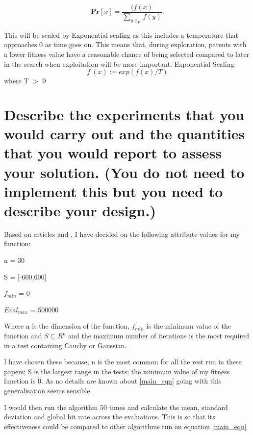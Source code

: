 \documentclass{article}
\begin{document}
\begin{equation}
\textbf{Pr}[x] = \frac{(f(x)}{\sum_{y\in_P} f(y)} .
\end{equation} 

This will be scaled by Exponential scaling as this includes a temperature that approaches 0 as time goes on. This means that, during exploration, parents with a lower fitness value have a reasonable chance of being selected compared to later in the search when exploitation will be more important. 
\bigbreak
Exponential Scaling:
\begin{equation}
 f~(x) := exp(f(x)/T)	
\end{equation}
where T $>$ 0

\section{Describe the experiments that you would carry out and the quantities that you would report to assess your solution. (You do not need to implement this but you need to describe your design.)}

Based on articles \cite{landscape} and \cite{faster}, I have decided on the following attribute values for my function:

\centerline{n = 30}
\centerline{S = $[$-600,600$]$}
\centerline{$f_{min}$ = 0}
\centerline{$Eval_{max}$ = 500000}

\smallbreak
Where n is the dimension of the function, $f_{min}$ is the minimum value of the function and $S \subseteq R^n$ and the maximum number of iterations is the most required in a test containing Cauchy or Gaussian.

I have chosen these because; n is the most common for all the rest run in these papers; S is the largest range in the tests; the minimum value of my fitness function is 0. As no details are known about \ref{main_eqn} going with this generalisation seems sensible.

\smallbreak

I would then run the algorithm 50 times and calculate the mean, standard deviation and global hit rate across the evaluations. This is so that its effectiveness could be compared to other algorithms run on equation \ref{main_eqn}
\end{document}

